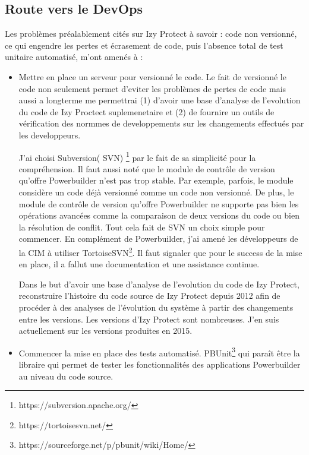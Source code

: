 \documentclass[a4paper]{article}
\begin{document}
\subsection{Route vers le DevOps}
\label{sec: devOps}
Les problèmes préalablement cités sur Izy Protect à savoir : code non versionné, ce qui engendre les pertes et écrasement de code, puis l'absence total de test unitaire automatisé, m'ont amenés à :
\begin{itemize}
\item  Mettre en place un serveur  pour versionné le code. 
Le fait de versionné le code  non seulement permet d'eviter les problèmes de pertes de code mais aussi a longterme me permettrai
(1) d'avoir une base d'analyse de l'evolution du code de Izy Proctect suplemenetaire et (2) de fournire  un outils de vérification des normmes de developpements sur les changements effectués par les developpeurs.
 
J'ai choisi Subversion( SVN) \footnote{https://subversion.apache.org/} par le fait de sa simplicité pour la compréhension.
Il faut aussi noté que le module de contrôle de version qu'offre Powerbuilder n'est pas trop stable. 
Par exemple, parfois, le module considère un code déjà versionné comme un code non versionné.
De plus, le module de contrôle de version qu'offre Powerbuilder ne supporte pas bien les opérations avancées comme la comparaison de deux versions du code ou bien la résolution de conflit. 
Tout cela fait de SVN un choix simple pour commencer.
En complément de Powerbuilder, j'ai amené les développeurs de la CIM à utiliser TortoiseSVN\footnote{https://tortoisesvn.net/}.
Il faut signaler que pour le success de la mise en place, il a fallut une documentation et une assistance continue.

Dans le but d'avoir une base d'analyse de l'evolution du code de Izy Protect, reconstruire l'histoire du code source de Izy Protect depuis 2012 afin de procéder à des analyses de l'évolution du système à partir des changements entre les versions. 
Les versions d'Izy Protect sont nombreuses. J'en suis actuellement sur les versions produites en 2015.
\item Commencer la mise en place des tests automatisé.
 PBUnit\footnote{https://sourceforge.net/p/pbunit/wiki/Home/} qui paraît être la libraire qui permet de tester les fonctionnalités des applications Powerbuilder au niveau du code source. 

\end{itemize}
\end{document}
